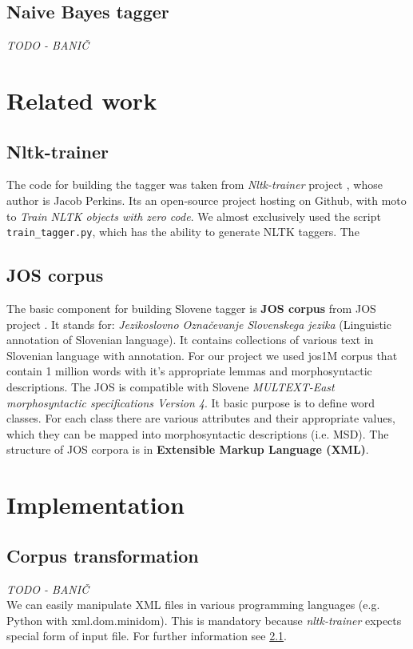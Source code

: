 \documentclass[11pt, conference, compsocconf]{IEEEtran}
\begin{document}
\subsection{Naive Bayes tagger} %
\textit{TODO - BANIČ}

\section{Related work}
\subsection{Nltk-trainer} %
The code for building the tagger was taken from \textit{Nltk-trainer}  project \cite{nltk-trainer}, whose author is Jacob Perkins.
Its an open-source project hosting on Github, with moto to \textit{Train NLTK objects with zero code}.
We almost exclusively used the script \texttt{train\_tagger.py}, which has the ability to generate NLTK taggers. The 

\subsection{JOS corpus} %
The basic component for building Slovene tagger is \textbf{JOS corpus} from JOS project \cite{JOS}. It stands for: \textit{Jezikoslovno Označevanje Slovenskega jezika} (Linguistic annotation of Slovenian language).
It contains collections of various text in Slovenian language with annotation.
For our project we used jos1M corpus that contain 1 million words with it's appropriate lemmas and morphosyntactic descriptions.
The JOS is compatible with Slovene\textit{ MULTEXT-East morphosyntactic specifications Version 4}\cite{MULTEXT-East}.
It basic purpose is to define word classes.
For each class there are various attributes and their appropriate values, which they can be mapped into morphosyntactic descriptions (i.e. MSD).
The structure of JOS corpora is in  \textbf{Extensible Markup Language (XML)}.

\section{Implementation}
\subsection{Corpus transformation} %
\label{Corpus transformation} 
\textit{TODO - BANIČ}\\
We can easily manipulate XML files in various programming languages (e.g. Python with xml.dom.minidom).
This is mandatory because \textit{nltk-trainer}\cite{nltk-trainer} expects special form of input file.
For further information see \ref{Corpus transformation}.
\end{document}

